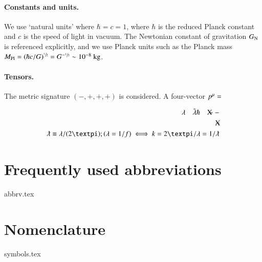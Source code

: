


\paragraph{Constants and units.} We use `natural units' where $\hbar = c = 1$, where $\hbar$ is the reduced Planck constant and $c$ is the speed of light in vacuum. The Newtonian constant of gravitation $G_\mathrm{N}$ is referenced explicitly, and we use Planck units such as the Planck mass $M_{\mathrm{Pl}} = \left( \hbar c /G \right)^{\sfrac{1}{2}} = G^{-\sfrac{1}{2}} \sim 10^{-8} ~\mathrm{kg}$.


\paragraph{Tensors.} The metric signature $(-,+,+,+)$ is considered. A four-vector $p\indices{^{\mu}} = $

\begin{equation}
    \begin{split}
        \lambda \quad \bar{\lambda} \hbar \quad \rlap{X}-- \\
        \text{X\hspace{-0.8em}\raisebox{0.75pt}{\,--}} \\
        \lambdabar \equiv \lambda /(2\ppi) ; (\lambda = 1/f) \iff k = 2\ppi/\lambda = 1/\lambdabar
    \end{split}
\end{equation}

\section*{Frequently used abbreviations}
{abbrv.tex}




\section*{Nomenclature}
{symbols.tex}